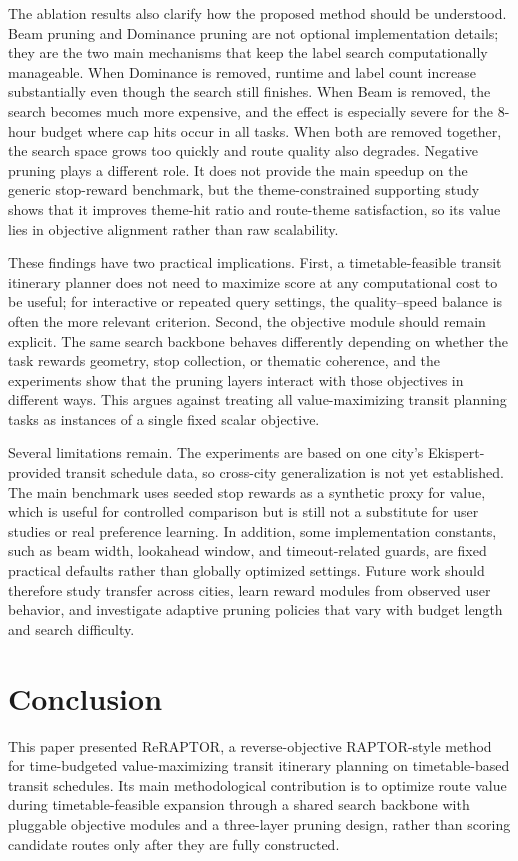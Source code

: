 The ablation results also clarify how the proposed method should be understood.
Beam pruning and Dominance pruning are not optional implementation details; they
are the two main mechanisms that keep the label search computationally
manageable.
When Dominance is removed, runtime and label count increase substantially even
though the search still finishes.
When Beam is removed, the search becomes much more expensive, and the effect is
especially severe for the 8-hour budget where cap hits occur in all tasks.
When both are removed together, the search space grows too quickly and route
quality also degrades.
Negative pruning plays a different role.
It does not provide the main speedup on the generic stop-reward benchmark, but
the theme-constrained supporting study shows that it improves theme-hit ratio
and route-theme satisfaction, so its value lies in objective alignment rather
than raw scalability.

These findings have two practical implications.
First, a timetable-feasible transit itinerary planner does not need to maximize
score at any computational cost to be useful; for interactive or repeated query
settings, the quality--speed balance is often the more relevant criterion.
Second, the objective module should remain explicit.
The same search backbone behaves differently depending on whether the task
rewards geometry, stop collection, or thematic coherence, and the experiments
show that the pruning layers interact with those objectives in different ways.
This argues against treating all value-maximizing transit planning tasks as
instances of a single fixed scalar objective.

Several limitations remain.
The experiments are based on one city's Ekispert-provided transit schedule
data, so cross-city generalization is not yet established.
The main benchmark uses seeded stop rewards as a synthetic proxy for
value, which is useful for controlled comparison but is still not a substitute
for user studies or real preference learning.
In addition, some implementation constants, such as beam width, lookahead
window, and timeout-related guards, are fixed practical defaults rather than
globally optimized settings.
Future work should therefore study transfer across cities, learn reward modules
from observed user behavior, and investigate adaptive pruning policies that vary
with budget length and search difficulty.

\section{Conclusion}
This paper presented ReRAP\-TOR, a reverse-objective RAPTOR-style method for
time-budgeted value-maximizing transit itinerary planning on timetable-based
transit schedules. Its main methodological contribution is to optimize route
value during timetable-feasible expansion through a shared search backbone with
pluggable objective modules and a three-layer pruning design, rather than
scoring candidate routes only after they are fully constructed.

